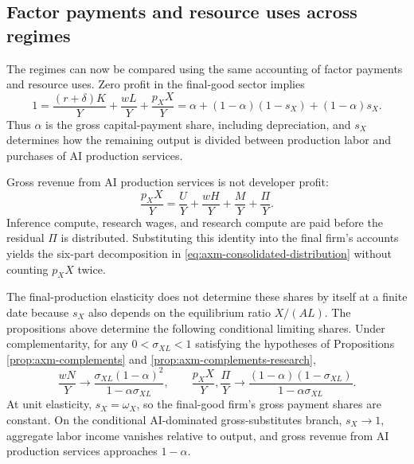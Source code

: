 \subsection{Factor payments and resource uses across regimes}
\label{sec:axm-distributional-accounting}

The regimes can now be compared using the same accounting of factor payments
and resource uses. Zero profit in the final-good sector implies
\begin{equation}
 1=\frac{(r+\delta)K}{Y}+\frac{wL}{Y}+\frac{p_XX}{Y}
 =\alpha+(1-\alpha)(1-s_X)+(1-\alpha)s_X.
 \label{eq:axm-final-sector-distribution}
\end{equation}
Thus \(\alpha\) is the gross capital-payment share, including depreciation, and
\(s_X\) determines how the remaining output is divided between production labor
and purchases of AI production services.

Gross revenue from AI production services is not developer profit:
\begin{equation}
 \frac{p_XX}{Y}=\frac{U}{Y}+\frac{wH}{Y}+\frac{M}{Y}+\frac{\Pi}{Y}.
 \label{eq:axm-developer-revenue-distribution}
\end{equation}
Inference compute, research wages, and research compute are paid before the
residual \(\Pi\) is distributed. Substituting this identity into the final firm's
accounts yields the six-part decomposition in
\eqref{eq:axm-consolidated-distribution} without counting \(p_XX\) twice.

The final-production elasticity does not determine these shares by itself at a
finite date because \(s_X\) also depends on the equilibrium ratio \(X/(AL)\). The
propositions above determine the following conditional limiting shares. Under
complementarity, for any \(0<\sigma_{XL}<1\) satisfying the hypotheses of Propositions
\ref{prop:axm-complements} and \ref{prop:axm-complements-research},
\begin{equation}
 \frac{wN}{Y}\longrightarrow
 \frac{\sigma_{XL}(1-\alpha)^2}{1-\alpha\sigma_{XL}},
 \qquad
 \frac{p_XX}{Y},\frac{\Pi}{Y}\longrightarrow
 \frac{(1-\alpha)(1-\sigma_{XL})}{1-\alpha\sigma_{XL}}.
 \label{eq:axm-complement-distribution}
\end{equation}
At unit elasticity, \(s_X=\omega_X\), so the final-good firm's gross payment
shares are constant. On the conditional AI-dominated gross-substitutes branch,
\(s_X\to1\), aggregate labor income vanishes relative to output, and gross
revenue from AI production services approaches \(1-\alpha\).

